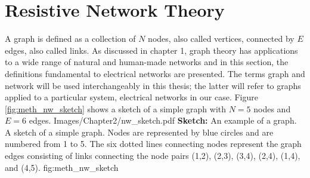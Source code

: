 \section{Resistive Network Theory}
\label{sec: Network Theory}
A graph is defined as a collection of $N$ nodes, also called vertices, connected by $E$ edges, also called links\cite{pozrikidis}. As discussed in chapter 1, graph theory has applications to a wide range of natural and human-made networks and in this section, the definitions fundamental to electrical networks are presented. The terms graph and network will be used interchangeably in this thesis; the latter will refer to graphs applied to a particular system\cite{pozrikidis}, electrical networks in our case. Figure \ref{fig:meth_nw_sketch} shows a sketch of a simple graph with $N = 5$ nodes and $E = 6$ edges. 
{Images/Chapter2/nw_sketch.pdf}
{\textbf{Sketch:} An example of a graph.}
{A sketch of a simple graph. Nodes are represented by blue circles and are numbered from 1 to 5. The six dotted lines connecting nodes represent the graph edges consisting of links connecting the node pairs (1,2), (2,3), (3,4), (2,4), (1,4), and (4,5).}
{fig:meth_nw_sketch}


